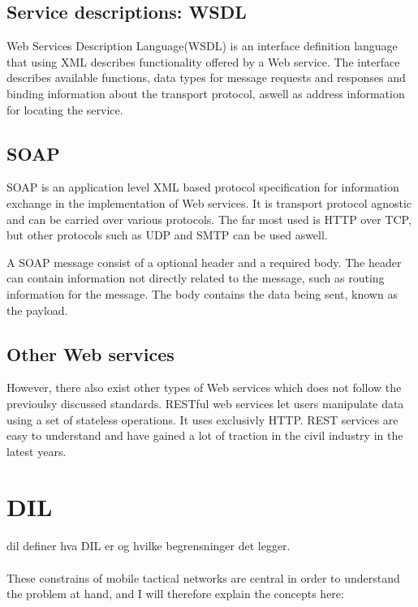 \documentclass[USenglish]{article}
\begin{document}
\subsection{Service descriptions: WSDL}
Web Services Description Language(WSDL) is an interface definition language that using XML describes functionality offered by a Web service. The interface describes available functions, data types for message requests and responses and binding information about the transport protocol, aswell as address information for locating the service. 

\subsection{SOAP}
SOAP is an application level XML based protocol specification for information exchange in the implementation of Web services. It is transport protocol agnostic and can be carried over various protocols. The far most used is HTTP over TCP, but other protocols such as UDP and SMTP can be used aswell.  

A SOAP message consist of a optional header and a required body. The header can contain information not directly related to the message, such as routing information for the message. The body contains the data being sent, known as the payload.

\subsection{Other Web services}
However, there also exist other types of Web services which does not follow the previoulsy discussed standards. RESTful web services let users manipulate data using a set of stateless operations. It uses exclusivly HTTP. REST services are easy to understand and have gained a lot of traction in the civil industry in the latest years.



\section{DIL}
\label{dil}
\gls{dil} definer hva DIL er og hvilke begrensninger det legger.
\paragraph{}
These constrains of mobile tactical networks are central in order to understand the problem at hand, and I will therefore explain the concepts here:
\end{document}
